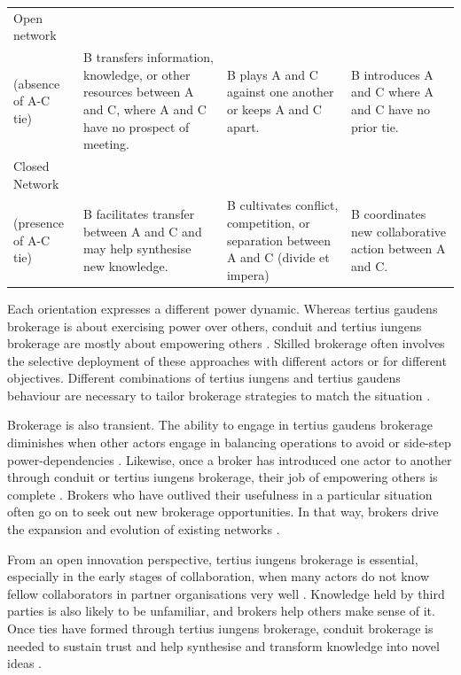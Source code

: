 \begin{table}
{\begin{threeparttable}
\begin{tabular*}{\textwidth}{>{\raggedright}p{5cm}>{\raggedright\arraybackslash}p{6cm}>{\raggedright\arraybackslash}p{6cm}>{\raggedright\arraybackslash}p{6cm}}
\midrule
Open network\\(absence of A-C tie) & B transfers information, knowledge, or other resources between A and C, where A and C have no prospect of meeting. & B plays A and C against one another or keeps A and C apart. & B introduces A and C where A and C have no prior tie. \\
\midrule
Closed Network\\(presence of A-C tie) & B facilitates transfer between A and C and may help synthesise new knowledge. & B cultivates conflict, competition, or separation between A and C (divide et impera) & B coordinates new collaborative action between A and C.  \\ 
\bottomrule
\end{tabular*}
\end{threeparttable}
}
\end{table}


Each orientation expresses a different power dynamic. Whereas tertius gaudens brokerage is about exercising power over others, conduit and tertius iungens brokerage are mostly about empowering others \citep{fleming2007collaborative,obstfeld2014brokerage}. Skilled brokerage often involves the selective deployment of these approaches with different actors or for different objectives. Different combinations of tertius iungens and tertius gaudens behaviour are necessary to tailor brokerage strategies to match the situation \citep{lingo2010nexus,obstfeld2014brokerage,quintane2016brokers}. \medskip

Brokerage is also transient. The ability to engage in tertius gaudens brokerage diminishes when other actors engage in balancing operations to avoid or side-step power-dependencies \citep{emerson1962power}. Likewise, once a broker has introduced one actor to another through conduit or tertius iungens brokerage, their job of empowering others is complete \citep{obstfeld2014brokerage}. Brokers who have outlived their usefulness in a particular situation often go on to seek out new brokerage opportunities. In that way, brokers drive the expansion and evolution of existing networks \citep{obstfeld2014brokerage,quintane2016brokers}. \medskip

From an open innovation perspective, tertius iungens brokerage is essential, especially in the early stages of collaboration, when many actors do not know fellow collaborators in partner organisations very well \citep{fleming2007collaborative}. Knowledge held by third parties is also likely to be unfamiliar, and brokers help others make sense of it. Once ties have formed through tertius iungens brokerage, conduit brokerage is needed to sustain trust and help synthesise and transform knowledge into novel ideas \citep{quintane2016brokers}. \medskip 

